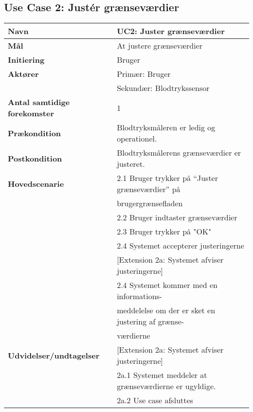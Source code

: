 \subsection{Use Case 2: Justér grænseværdier}
\begin{table}[h!]
	\begin{tabular}{l|l}
		\rowcolor[HTML]{A9D9F9} 
		\textbf{Navn} & UC2: Juster grænseværdier \\ \hline
		\textbf{Mål} & At justere grænseværdier \\ \hline
		\rowcolor[HTML]{A9D9F9} 
		\textbf{Initiering} & Bruger \\ \hline
		\textbf{Aktører} & Primær: Bruger \\
		\textbf{} & Sekundær: Blodtrykssensor \\ \hline
		\rowcolor[HTML]{A9D9F9} 
		\textbf{Antal samtidige forekomster} & 1 \\ \hline
		\textbf{Prækondition} & Blodtryksmåleren er ledig og operationel. \\ \hline
		\rowcolor[HTML]{A9D9F9} 
		\textbf{Postkondition} & Blodtryksmålerens grænseværdier er justeret. \\ \hline
		\textbf{Hovedscenarie} & 2.1 Bruger trykker på “Juster grænseværdier” på \\
		\textbf{} & brugergrænsefladen \\
		\textbf{} & 2.2 Bruger indtaster grænseværdier \\
		\textbf{} & 2.3 Bruger trykker på "OK" \\
		\textbf{} & 2.4 Systemet accepterer justeringerne \\
		\textbf{} & {[}Extension 2a: Systemet afviser justeringerne{]} \\
		\textbf{} & 2.4 Systemet kommer med en informations- \\
		\textbf{} & meddelelse om der er sket en justering af grænse- \\ 
		\textbf{} & værdierne \\\hline
		\rowcolor[HTML]{A9D9F9} 
		\textbf{Udvidelser/undtagelser} & {[}Extension 2a: Systemet afviser justeringerne{]} \\
		\rowcolor[HTML]{A9D9F9} 
		& 2a.1 Systemet meddeler at grænseværdierne er ugyldige. \\
		\rowcolor[HTML]{A9D9F9} 
		& 2a.2 Use case afsluttes
	\end{tabular}
\end{table}